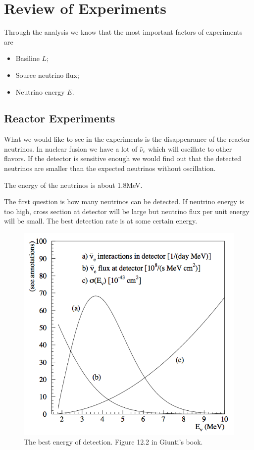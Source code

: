 \documentclass[letterpaper,12pt,english]{sphinxmanual}
\begin{document}
\section{Review of Experiments}
\label{experiments:review-of-experiments}
Through the analysis we know that the most important factors of experiments are
\begin{itemize}
\item {} 
Basiline \(L\);

\item {} 
Source neutrino flux;

\item {} 
Neutrino energy \(E\).

\end{itemize}


\subsection{Reactor Experiments}
\label{experiments:reactor-experiments}
What we would like to see in the experiments is the disappearance of the reactor neutrinos. In nuclear fusion we have a lot of \(\bar\nu_e\) which will oscillate to other flavors. If the detector is sensitive enough we would find out that the detected neutrinos are smaller than the expected neutrinos without oscillation.

The energy of the neutrinos is about 1.8MeV.

The first question is how many neutrinos can be detected. If neutrino energy is too high, cross section at detector will be large but neutrino flux per unit energy will be small. The best detection rate is at some certain energy.
\begin{figure}[htbp]
\centering
\capstart

\includegraphics{reactorDetection.png}
\caption{The best energy of detection. Figure 12.2 in Giunti's book.}\end{figure}
\end{document}

